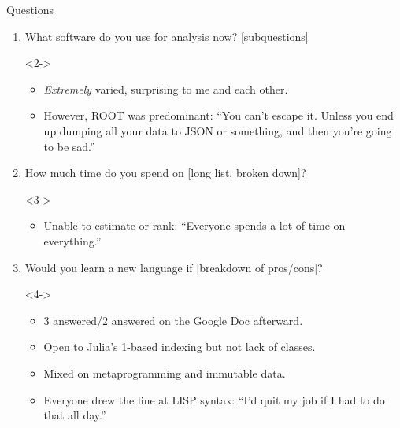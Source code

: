 \documentclass{beamer}
\begin{document}
\begin{frame}{Questions}
\vspace{0.5 cm}
\begin{enumerate}
\item What software do you use for analysis now? [subquestions]

\begin{uncoverenv}<2->
\begin{itemize}
\item {\it Extremely} varied, surprising to me and each other.
\item However, ROOT was predominant: \textcolor{aug29}{``You can't escape it. Unless you end up dumping all your data to JSON or something, and then you're going to be sad.''}
\end{itemize}
\end{uncoverenv}

\item How much time do you spend on [long list, broken down]?

\begin{uncoverenv}<3->
\begin{itemize}
\item Unable to estimate or rank: \textcolor{aug29}{``Everyone spends a lot of time on everything.''}
\end{itemize}
\end{uncoverenv}

\item Would you learn a new language if [breakdown of pros/cons]?

\begin{uncoverenv}<4->
\begin{itemize}
\item \textcolor{aug29}{3 answered}/\textcolor{aug31}{2 answered} on the Google Doc afterward.
\item Open to Julia's 1-based indexing but not lack of classes.
\item Mixed on metaprogramming and immutable data.
\item Everyone drew the line at LISP syntax: \textcolor{aug31}{``I'd quit my job if I had to do that all day.''}
\end{itemize}
\end{uncoverenv}
\end{enumerate}
\end{frame}
\end{document}
